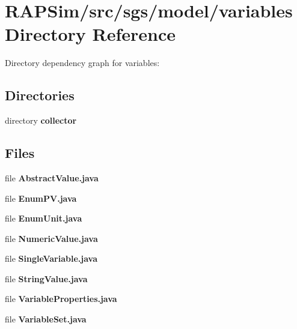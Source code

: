 \section{R\-A\-P\-Sim/src/sgs/model/variables Directory Reference}
\label{dir_b23003d7924a12d8dc324a51cf627a32}
Directory dependency graph for variables\-:
\subsection*{Directories}
\begin{DoxyCompactItemize}
\item 
directory {\bf collector}
\end{DoxyCompactItemize}
\subsection*{Files}
\begin{DoxyCompactItemize}
\item 
file {\bf Abstract\-Value.\-java}
\item 
file {\bf Enum\-P\-V.\-java}
\item 
file {\bf Enum\-Unit.\-java}
\item 
file {\bf Numeric\-Value.\-java}
\item 
file {\bf Single\-Variable.\-java}
\item 
file {\bf String\-Value.\-java}
\item 
file {\bf Variable\-Properties.\-java}
\item 
file {\bf Variable\-Set.\-java}
\end{DoxyCompactItemize}
